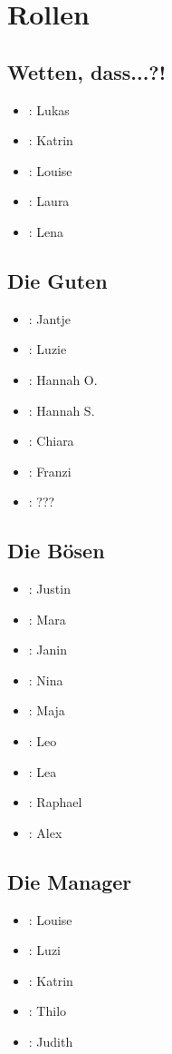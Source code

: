 \section{Rollen}
\begin{multicols}{2}
\subsection{Wetten, dass...?!}
\begin{itemize}
\item \thomash: Lukas
\item \jeremyh: Katrin
\item \ronh: Louise
\item \kevinh: Laura
\item \jacquelineh: Lena
\end{itemize}

\subsection{Die Guten}
\begin{itemize}
\item \olafh: Jantje
\item \meridah: Luzie
\item \aladdinh: Hannah O.
\item \jackh: Hannah S.
\item \remyh: Chiara
\item \pocahontash: Franzi
\item \moderatorh: ???
\end{itemize}

\subsection{Die Bösen}
\begin{itemize}
\item \mickeyh: Justin
\item \schneewittchenh: Mara
\item \doch: Janin
\item \rkh: Nina
\item \maleficenth: Maja
\item \willyh: Leo
\item \winnieh: Lea
\item \wacheah: Raphael
\item \wachebh: Alex
\end{itemize}

\subsection{Die Manager}
\begin{itemize}
\item \managerah: Louise
\item \managerbh: Luzi
\item \managerch: Katrin
\item \managerdh: Thilo
\item \managereh: Judith
\end{itemize}
\end{multicols}

